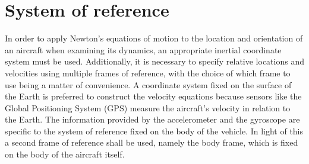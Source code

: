 \documentclass[twocolumn,showpacs,
    nofootinbib,aps,superscriptaddress,
    eqsecnum,prd,showkeys,10pt,floatfix]{revtex4}
\begin{document}
\section{System of reference}
In order to apply Newton's equations of motion to the location and orientation
of an aircraft when examining its dynamics, an appropriate inertial coordinate
system must be used. Additionally, it is necessary to specify relative
locations and velocities using multiple frames of reference, with the choice of
which frame to use being a matter of convenience. A coordinate system fixed on
the surface of the Earth is preferred to construct the velocity equations
because sensors like the Global Positioning System (GPS) measure the aircraft's
velocity in relation to the Earth. The information provided by the
accelerometer and the gyroscope are specific to the system of reference fixed
on the body of the vehicle. In light of this a second frame of reference shall
be used, namely the body frame, which is fixed on the body of the aircraft
itself.

\end{document}
